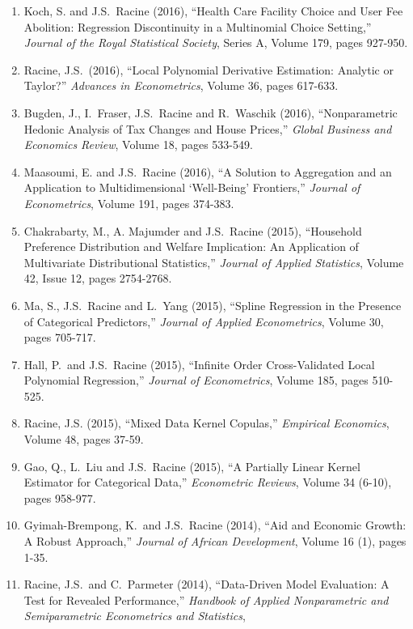 \documentclass[
]{article}
\begin{document}
\begin{enumerate}
  Reverend Find Common Ground,'' \emph{Econometric Reviews}, Volume 36
  (1-3), pages 241-256.
\item
  Koch, S. and J.S.~Racine (2016), ``Health Care Facility Choice and
  User Fee Abolition: Regression Discontinuity in a Multinomial Choice
  Setting,'' \emph{Journal of the Royal Statistical Society}, Series A,
  Volume 179, pages 927-950.
\item
  Racine, J.S.~(2016), ``Local Polynomial Derivative Estimation:
  Analytic or Taylor?'' \emph{Advances in Econometrics}, Volume 36,
  pages 617-633.
\item
  Bugden, J., I.~Fraser, J.S.~Racine and R.~Waschik (2016),
  ``Nonparametric Hedonic Analysis of Tax Changes and House Prices,''
  \emph{Global Business and Economics Review}, Volume 18, pages 533-549.
\item
  Maasoumi, E. and J.S.~Racine (2016), ``A Solution to Aggregation and
  an Application to Multidimensional `Well-Being' Frontiers,''
  \emph{Journal of Econometrics}, Volume 191, pages 374-383.
\item
  Chakrabarty, M., A. Majumder and J.S.~Racine (2015), ``Household
  Preference Distribution and Welfare Implication: An Application of
  Multivariate Distributional Statistics,'' \emph{Journal of Applied
  Statistics}, Volume 42, Issue 12, pages 2754-2768.
\item
  Ma, S., J.S.~Racine and L.~Yang (2015), ``Spline Regression in the
  Presence of Categorical Predictors,'' \emph{Journal of Applied
  Econometrics}, Volume 30, pages 705-717.
\item
  Hall, P.~and J.S.~Racine (2015), ``Infinite Order Cross-Validated
  Local Polynomial Regression,'' \emph{Journal of Econometrics}, Volume
  185, pages 510-525.
\item
  Racine, J.S. (2015), ``Mixed Data Kernel Copulas,'' \emph{Empirical
  Economics}, Volume 48, pages 37-59.
\item
  Gao, Q., L.~Liu and J.S.~Racine (2015), ``A Partially Linear Kernel
  Estimator for Categorical Data,'' \emph{Econometric Reviews}, Volume
  34 (6-10), pages 958-977.
\item
  Gyimah-Brempong, K.~and J.S.~Racine (2014), ``Aid and Economic Growth:
  A Robust Approach,'' \emph{Journal of African Development}, Volume 16
  (1), pages 1-35.
\item
  Racine, J.S.~and C.~Parmeter (2014), ``Data-Driven Model Evaluation: A
  Test for Revealed Performance,'' \emph{Handbook of Applied
  Nonparametric and Semiparametric Econometrics and Statistics},

\end{enumerate}
\end{document}
